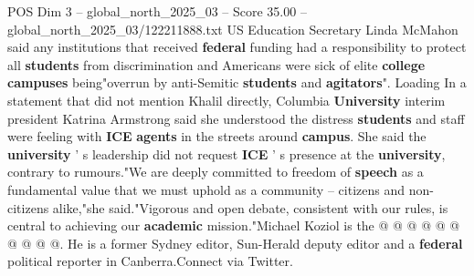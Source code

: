 \begin{textsample}{POS Dim 3 – global\_north\_2025\_03 – Score 35.00 – global\_north\_2025\_03/122211888.txt}
US Education Secretary Linda McMahon said any institutions that received \textbf{federal} funding had a responsibility to protect all \textbf{students} from discrimination and Americans were sick of elite \textbf{college} \textbf{campuses} being"overrun by anti-Semitic \textbf{students} and \textbf{agitators}".
Loading In a statement that did not mention Khalil directly, Columbia \textbf{University} interim president Katrina Armstrong said she understood the distress \textbf{students} and staff were feeling with \textbf{ICE} \textbf{agents} in the streets around \textbf{campus}.
She said the \textbf{university} ' s leadership did not request \textbf{ICE} ' s presence at the \textbf{university}, contrary to rumours."We are deeply committed to freedom of \textbf{speech} as a fundamental value that we must uphold as a community -- citizens and non-citizens alike,"she said."Vigorous and open debate, consistent with our rules, is central to achieving our \textbf{academic} mission."Michael Koziol is the @ @ @ @ @ @ @ @ @ @.
He is a former Sydney editor, Sun-Herald deputy editor and a \textbf{federal} political reporter in Canberra.Connect via Twitter.

\end{textsample}
